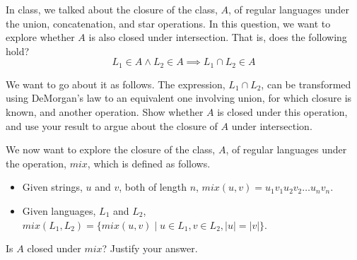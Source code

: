 \documentclass[addpoints]{exam}
\theoremstyle{claim}
\begin{document}
\begin{questions}

\question[5] In class, we talked about the closure of the class, $A$, of regular languages under the union, concatenation, and star operations. In this question, we want to explore whether $A$ is also closed under intersection. That is, does the following hold?
  \[
    L_1\in A \land L_2\in A \implies L_1 \cap L_2\in A
  \]

  We want to go about it as follows. The expression, $L_1 \cap L_2$, can be transformed using DeMorgan's law to an equivalent one involving union, for which closure is known, and another operation. Show whether $A$ is closed under this operation, and use your result to argue about the closure of $A$ under intersection.

\question[5] We now want to explore the closure of the class, $A$, of regular languages under the operation, $mix$, which is defined as follows.
  \begin{itemize}
  \item Given strings, $u$ and $v$, both of length $n$, $mix(u,v) = u_1v_1u_2v_2\ldots u_nv_n$.
  \item Given languages, $L_1$ and $L_2$, $mix(L_1,L_2) = \{mix(u,v) \mid u\in L_1, v\in L_2, |u| = |v|\}$.
  \end{itemize}
  Is $A$ closed under $mix$? Justify your answer.
  
\end{questions}
\end{document}
